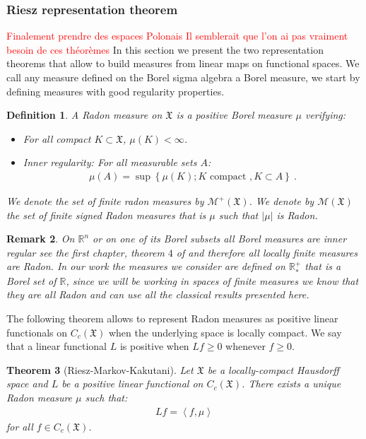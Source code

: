 \documentclass[11pt,a4paper]{article}
\newcommand{\RR}{\mathbb{R}}
\newcommand{\RRP}{\mathbb{R}^+_*}
\newcommand{\MC}{\mathcal{M}}
\newcommand{\XF}{\mathfrak{X}}
\newcommand{\red}[1]{\textcolor{red}{#1}}
\newcommand{\brac}[1]{\left\langle#1\right\rangle}
\newtheorem{theorem}{Theorem}[section]
\newtheorem{remark}[theorem]{Remark}
\newtheorem{definition}[theorem]{Definition}
\begin{document}
\subsubsection{Riesz representation theorem}
\red{Finalement prendre des espaces Polonais}
\red{Il semblerait que l'on ai pas vraiment besoin de ces théorèmes}
In this section we present the two representation theorems that allow to build measures from linear maps on functional spaces. We call any measure defined on the Borel sigma algebra a Borel measure, we start by defining measures with good regularity properties.
\begin{definition}
    A Radon measure on $\XF$ is a positive Borel measure $\mu$ verifying:
    \begin{itemize}
        \item For all compact $K\subset \XF$, $\mu(K) < \infty$.
        \item Inner regularity: For all measurable sets $A$:
        \begin{align*}
            \mu(A) = \sup{\left\lbrace \mu(K) ; K \text{ compact }, K \subset A\right\rbrace}\ .
        \end{align*}
    \end{itemize}
    We denote the set of finite radon measures by $\MC^+(\XF)$. We denote by $\MC(\XF)$ the set of finite signed Radon measures that is $\mu$ such that $|\mu|$ is Radon.
\end{definition}
\begin{remark}
    On $\RR^n$ or on one of its Borel subsets all Borel measures are inner regular see the first chapter, theorem $4$ of \cite{evans2018measure} and therefore all locally finite measures are Radon. In our work the measures we consider are defined on $\RRP$ that is a Borel set of $\RR$, since we will be working in spaces of finite measures we know that they are all Radon and can use all the classical results presented here. 
\end{remark}
 The following theorem allows to represent Radon measures as positive linear functionals on $C_c(\XF)$ when the underlying space is locally compact. We say that a linear functional $L$ is positive when $Lf \geq 0$ whenever $f \geq 0$.
\begin{theorem}[Riesz-Markov-Kakutani]
    Let $\XF$ be a locally-compact Hausdorff space and $L$ be a positive linear functional on $C_c(\XF)$. There exists a unique Radon measure $\mu$ such that:
    \begin{align*}
        Lf = \brac{f,\mu}
    \end{align*}
    for all $f \in C_c(\XF)$.
\end{theorem}
\end{document}
